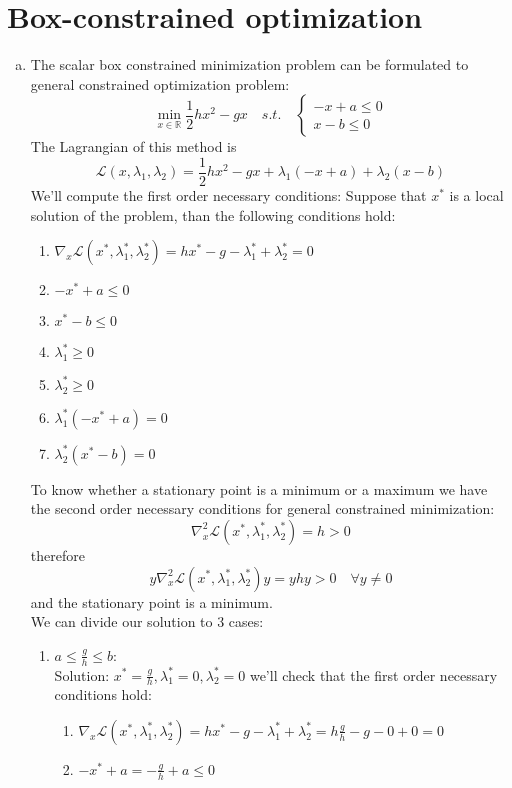 \documentclass{article}
\begin{document}
\section{Box-constrained optimization}
\begin{enumerate}[(a)]
\item The scalar box constrained minimization problem can be formulated to general constrained optimization problem:
\[\min_{x\in \mathbb{R}}\frac{1}{2}hx^2-gx\quad s.t. \quad  
\begin{cases}
-x+a \le 0\\
x-b \le 0
\end{cases}
\]
The Lagrangian of this method is
\[\mathcal{L}(x, \lambda_1, \lambda_2) =  \frac{1}{2}hx^2-gx + \lambda_1(-x+a) + \lambda_2(x-b)\]
We'll compute the first order necessary conditions: Suppose that $x^*$ is a local solution of the problem, than the following conditions hold:
\begin{enumerate}[(1)] 
\item $\nabla_x\mathcal{L}(x^*, \lambda_1^*, \lambda_2^*) = hx^*-g -\lambda_1^*+\lambda_2^* = 0$
\item $-x^*+a \le 0$
\item $x^*-b \le 0$
\item $\lambda_1^* \ge 0$
\item $\lambda_2^* \ge 0$
\item $\lambda_1^*(-x^*+a) = 0$
\item $\lambda_2^*(x^*-b) = 0$
\end{enumerate}
To know whether a stationary point is a minimum or a maximum we have the second order necessary conditions for general constrained minimization:
\[\nabla_x^2\mathcal{L}(x^*, \lambda_1^*, \lambda_2^*) = h > 0\]
therefore
\[y\nabla_x^2\mathcal{L}(x^*, \lambda_1^*, \lambda_2^*)y  = yhy> 0 \quad \forall y \ne 0\]
and the stationary point is a minimum.\\
We can divide our solution to 3 cases:
\begin{enumerate}
\item $a \le \frac{g}{h} \le b$:\\
Solution: $x^* =  \frac{g}{h}, \lambda_1^* = 0, \lambda_2^* = 0$
we'll check that the first order necessary conditions hold:
\begin{enumerate}[(1)] 
\item $\nabla_x\mathcal{L}(x^*, \lambda_1^*, \lambda_2^*) = hx^*-g -\lambda_1^*+\lambda_2^*  = h\frac{g}{h}-g -0+0 = 0$
\item $-x^*+a  = -\frac{g}{h}+a \le 0$

\end{enumerate}
\end{enumerate}
\end{enumerate}
\end{document}
